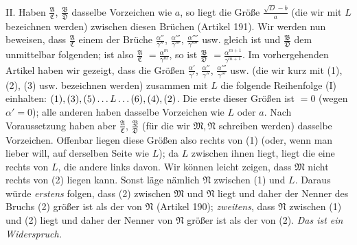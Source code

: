 II. Haben $\frac{\mathfrak{A}}{\mathfrak{C}}$, $\frac{\mathfrak{B}}{\mathfrak{D}}$ dasselbe Vorzeichen wie $a$, so liegt die Größe $\frac{\surd D-b}{a}$ (die wir mit $L$ bezeichnen werden) zwischen diesen Brüchen (Artikel 191). Wir werden nun beweisen, dass $\frac{\mathfrak{A}}{\mathfrak{C}}$ einem der Brüche $\frac{\alpha''}{\gamma''}$, $\frac{\alpha'''}{\gamma'''}$, $\frac{\alpha''''}{\gamma''''}$ usw. gleich ist und $\frac{\mathfrak{B}}{\mathfrak{D}}$ dem unmittelbar folgenden; ist also $\frac{\mathfrak{A}}{\mathfrak{C}}$ $=\frac{\alpha^m}{\gamma^m}$, so ist $\frac{\mathfrak{B}}{\mathfrak{D}}$ $=\frac{\alpha^{m+1}}{\gamma^{m+1}}$. Im vorhergehenden Artikel haben wir gezeigt, dass die Größen $\frac{\alpha'}{\gamma'}$, $\frac{\alpha''}{\gamma''}$, $\frac{\alpha'''}{\gamma'''}$ usw. (die wir kurz mit (1), (2), (3) usw. bezeichnen werden) zusammen mit $L$ die folgende Reihenfolge (I) einhalten: $(1),(3),(5)\mathinner{\ldotp\ldotp\ldotp} L\mathinner{\ldotp\ldotp\ldotp}(6),(4),(2)$. Die erste dieser Größen ist $=0$ (wegen $\alpha'=0$); alle anderen haben dasselbe Vorzeichen wie $L$ oder $a$. Nach Voraussetzung haben aber $\frac{\mathfrak{A}}{\mathfrak{C}}$, $\frac{\mathfrak{B}}{\mathfrak{D}}$ (für die wir $\mathfrak{M},\mathfrak{N}$ schreiben werden) dasselbe Vorzeichen. Offenbar liegen diese Größen also rechts von (1) (oder, wenn man lieber will, auf derselben Seite wie $L$); da $L$ zwischen ihnen liegt, liegt die eine rechts von $L$, die andere links davon. Wir können leicht zeigen, dass $\mathfrak{M}$ nicht rechts von (2) liegen kann. Sonst läge nämlich $\mathfrak{N}$ zwischen (1) und $L$. Daraus würde \textit{erstens} folgen, dass (2) zwischen $\mathfrak{M}$ und $\mathfrak{N}$ liegt und daher der Nenner des Bruchs (2) größer ist als der von $\mathfrak{N}$ (Artikel 190); \textit{zweitens}, dass $\mathfrak{N}$ zwischen (1) und (2) liegt und daher der Nenner von $\mathfrak{N}$ größer ist als der von (2). \textit{Das ist ein Widerspruch.}

